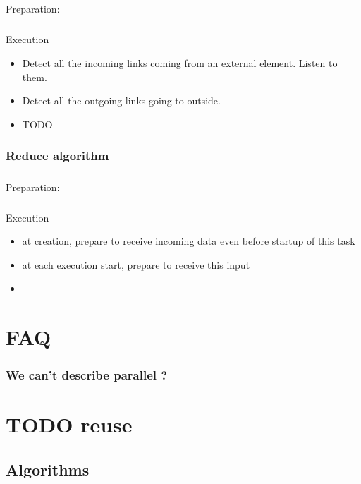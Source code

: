 \documentclass[a4paper,10pt]{book}
\begin{document}
\paragraph*{}
Preparation:

\paragraph*{}
Execution
\begin{itemize}
\item Detect all the incoming links coming from an external element. Listen to them.
\item Detect all the outgoing links going to outside. 
\item TODO
\end{itemize}

\subsection{Reduce algorithm}

\paragraph*{}
Preparation:

\paragraph*{}
Execution
\begin{itemize}
\item at creation, prepare to receive incoming data even before startup of this task
\item at each execution start, prepare to receive this input
\item 
\end{itemize}

\chapter{FAQ}

\subsection{We can't describe parallel ?}


\chapter{TODO reuse}

\section{Algorithms}
\end{document}
